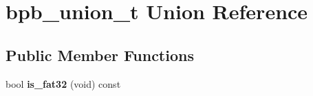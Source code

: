 \hypertarget{unionbpb__union__t}{\section{bpb\-\_\-union\-\_\-t Union Reference}
\label{unionbpb__union__t}
}
\subsection*{Public Member Functions}
\begin{DoxyCompactItemize}
\item 
\hypertarget{unionbpb__union__t_aaa23a2517d10978758920286d82328a3}{bool {\bfseries is\-\_\-fat32} (void) const }\label{unionbpb__union__t_aaa23a2517d10978758920286d82328a3}

\end{DoxyCompactItemize}
